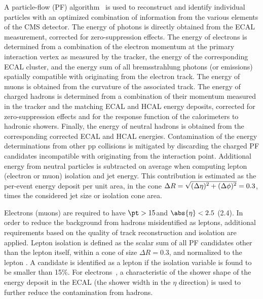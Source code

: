 A particle-flow (PF) algorithm~\cite{PF1,CMS-PAS-PFT-10-001} is used to reconstruct
and identify individual particles with an optimized combination of
information from the various elements of the CMS detector. The energy
of photons is directly obtained from the ECAL measurement, corrected
for zero-suppression effects. The energy of electrons is determined
from a combination of the electron momentum at the primary interaction
vertex as measured by the tracker, the energy of the corresponding
ECAL cluster, and the energy sum of all bremsstrahlung photons (or emissions)
spatially compatible with originating from the electron track. The
energy of muons is obtained from the curvature of the associated
track. The energy of charged hadrons is determined from a combination
of their momentum measured in the tracker and the matching ECAL and
HCAL energy deposits, corrected for zero-suppression effects and for
the response function of the calorimeters to hadronic
showers. Finally, the energy of neutral hadrons is obtained from the
corresponding corrected ECAL and HCAL energies. Contamination of the
energy determinations from other pp collisions is mitigated by
discarding the charged PF candidates incompatible with originating from the interaction point.  Additional
energy from neutral particles is subtracted on average when computing
lepton (electron or muon) isolation and jet energy. This contribution is estimated as the
per-event energy deposit per unit area, in the cone $\Delta R = \sqrt{\smash[b]{(\Delta
  \eta)^2+(\Delta\phi)^2}}=0.3$, times the considered jet size or
isolation cone area.

Electrons (muons) are required to have $\pt>15$\GeV and  $\abs{\eta}<2.5$
(2.4). In order to reduce the
background from hadrons misidentified as leptons, additional
requirements based on the
quality of track reconstruction and isolation are applied. Lepton isolation is
defined as the scalar \pt sum of all PF candidates other than the
lepton itself, within a cone of size $\Delta R = 0.3$, and normalized to the lepton \pt. A
candidate is identified as a lepton if the isolation variable is found to be smaller than 15\%.
For electrons~\cite{ElectronsCMS}, a characteristic of the shower
shape of the energy deposit in the ECAL (the shower width in the
$\eta$ direction) is used to further reduce the contamination from hadrons.


